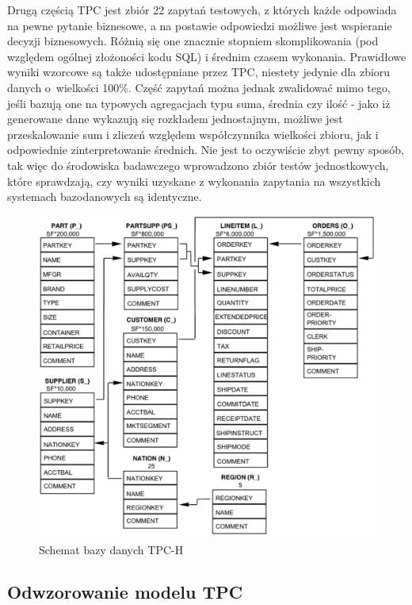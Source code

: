 \documentclass[12pt,twoside,openright]{extarticle}
\begin{document}
    Drugą częścią TPC jest zbiór 22 zapytań testowych, z których każde odpowiada na pewne pytanie biznesowe, a na postawie odpowiedzi możliwe jest wspieranie decyzji biznesowych. Różnią się one znacznie stopniem skomplikowania (pod względem ogólnej złożoności kodu SQL) i średnim czasem wykonania. Prawidłowe wyniki wzorcowe są także udostępniane przez TPC, niestety jedynie dla zbioru danych o~wielkości 100\%. Część zapytań można jednak zwalidować mimo tego, jeśli bazują one na typowych agregacjach typu suma, średnia czy ilość - jako iż generowane dane wykazują się rozkładem jednostajnym, możliwe jest przeskalowanie sum i zliczeń względem współczynnika wielkości zbioru, jak i odpowiednie zinterpretowanie średnich. Nie jest to oczywiście zbyt pewny sposób, tak więc do środowiska badawczego wprowadzono zbiór testów jednostkowych, które sprawdzają, czy wyniki uzyskane z wykonania zapytania na wszystkich systemach bazodanowych są identyczne.

\begin{figure}
\centering
\includegraphics[width=14cm]{tpc-schema.png}
\caption{Schemat bazy danych TPC-H}
\label{fig:tpcschema}
\end{figure}


\subsection{Odwzorowanie modelu TPC}
\end{document}
